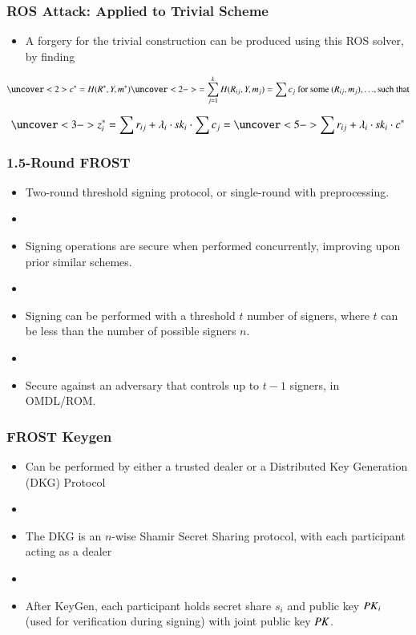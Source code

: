 \documentclass[hyperref={pdfpagelabels=true},table,dvipsnames,14pt,aspectratio=169]{beamer}
\begin{document}
\begin{frame}
  \frametitle{ROS Attack: Applied to Trivial Scheme}

  \begin{itemize}
    \item<1-> A forgery for the trivial construction can be produced using this ROS solver, by finding 
  \end{itemize}
	\[ \uncover<2> { c^*= H(R^*, Y, m^*) \uncover<2->{ = \sum_{j=1}^{k} H(R_{ij}, Y, m_j)  =
	\sum c_j  \text{ for some } (R_{ij}, m_j), \dots }, \text{such that} } \]

	\[ \uncover<3-> {z_i^* = \sum r_{ij} + \lambda_i \cdot \sk_i \cdot \sum c_j} = \uncover<5->
	{ \sum r_{ij} + \lambda_i \cdot \sk_i \cdot c^*} \]
\end{frame}

\begin{frame}
  \frametitle{1.5-Round FROST}

  \begin{itemize}
    \item<1-> Two-round threshold signing protocol, or single-round with preprocessing.
    \item[]
    \item<2-> Signing operations are secure when performed concurrently,
      improving upon prior similar schemes.
    \item[]
    \item<3-> Signing can be performed with a threshold $t$ number of signers,
      where $t$ can be less than the number of possible signers $n$.
    \item[]
    \item<4-> Secure against an adversary that controls up to $t-1$ signers, in OMDL/ROM.
  \end{itemize}
\end{frame}

\begin{frame}
  \frametitle{FROST Keygen}

  \begin{itemize}
    \item<1-> Can be performed by either a trusted dealer or a Distributed Key
      Generation (DKG) Protocol
    \item[]
    \item<2-> The DKG is an $n$-wise Shamir Secret Sharing protocol, with each
      participant acting as a dealer
    \item[]
    \item<3> After KeyGen, each participant holds secret share $s_i$ and
      public key $\mathit{PK}_i$ (used for verification during signing) with joint public key $\mathit{PK}$.
  \end{itemize}

\end{frame}
\end{document}

